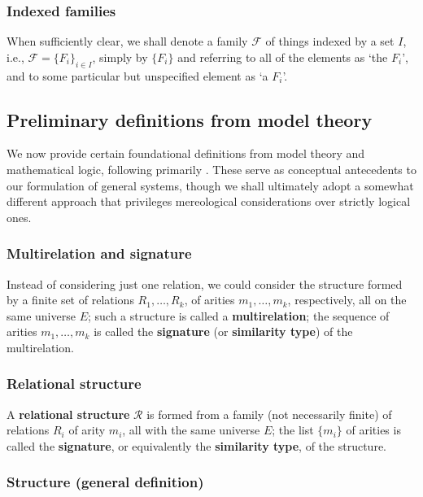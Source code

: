 \subsubsection{Indexed families}

When sufficiently clear, we shall denote a family $\mathcal{F}$ of things indexed by a set $I$, i.e., $\mathcal{F} = \{F_i\}_{i\in I}$, simply by $\{F_i\}$ and referring to all of the elements as `the $F_i$', and to some particular but unspecified element as `a $F_i$'. 

\subsection{Preliminary definitions from model theory}

We now provide certain foundational definitions from model theory and mathematical logic, following primarily \cite{Poizat2000}. These serve as conceptual antecedents to our formulation of general systems, though we shall ultimately adopt a somewhat different approach that privileges mereological considerations over strictly logical ones.

\subsubsection{Multirelation and signature}

Instead of considering just one relation, we could consider the structure formed by a finite set of relations $R_1, \ldots, R_k$, of arities $m_1, \ldots, m_k$, respectively, all on the same universe $E$; such a structure is called a \textbf{multirelation}; the sequence of arities $m_1, \ldots, m_k$ is called the \textbf{signature} (or \textbf{similarity type}) of the multirelation.

\subsubsection{Relational structure}

A \textbf{relational structure} $\mathcal{R}$ is formed from a family (not necessarily finite) of relations $R_i$ of arity $m_i$, all with the same universe $E$; the list $\{m_i\}$ of arities is called the \textbf{signature}, or equivalently the \textbf{similarity type}, of the structure.

\subsubsection{Structure (general definition)}

